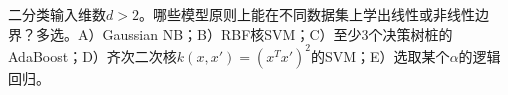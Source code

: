 二分类输入维数\(d>2\)。哪些模型原则上能在不同数据集上学出线性或非线性边界？多选。A）Gaussian NB；B）RBF核SVM；C）至少3个决策树桩的AdaBoost；D）齐次二次核\(k(x,x')=(x^Tx')^2\)的SVM；E）选取某个\(\alpha\)的逻辑回归。
